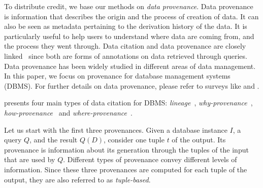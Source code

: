 To distribute credit, we base our methods on \emph{data provenance}. 
Data provenance is information that describes the origin and the process of creation of data. It can also be seen as metadata pertaining to the derivation history of the data. 
It is particularly useful to help users to understand where data are coming from, and the process they went through. 
Data citation and data provenance are closely linked~\citep{AlawiniDSTW17} since both are forms of annotations on data retrieved through queries. 
Data provenance has been widely studied in different areas of data management. 
In this paper, we focus on provenance for database management systems (DBMS). For further details on data provenance, please refer to surveys like \citep{CheneyProvSurvey} and \citep{SimmhanPG05}.

\citet{CheneyProvSurvey} presents four main types of data citation for DBMS: \emph{lineage}~\citep{lineageCui}, \emph{why-provenance}~\citep{WhyProvBuneman}, \emph{how-provenance}~\citep{howProvenanceGreen} and \emph{where-provenance}~\citep{WhyProvBuneman}.

Let us start with the first three provenances. Given a database instance $I$, a query $Q$, and the result $Q(D)$, consider one tuple $t$ of the output. 
Its provenance is information about its generation through the tuples of the input that are used by $Q$. Different types of provenance convey different levels of information. Since these three provenances are computed for each tuple of the output, they are also referred to as \emph{tuple-based}.

%
%
%


